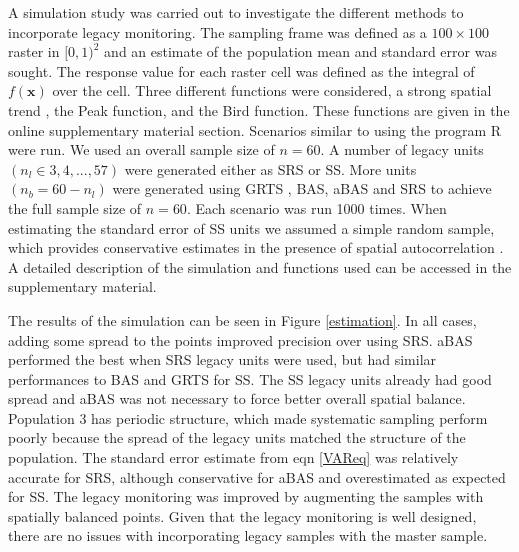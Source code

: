 \documentclass[titlepage]{article}
\begin{document}
A simulation study was carried out to investigate the different methods to incorporate legacy monitoring. The sampling frame was defined as a $100\times100$ raster in $[0,1)^2$ and an estimate of the population mean and standard error was sought. The response value for each raster cell was defined as the integral of $f(\boldsymbol{x})$ over the cell. Three different functions were considered, a strong spatial trend \citep{Robertson2013, Grafstrom2012}, the Peak function, and the Bird function. These functions are given in the online supplementary material section. Scenarios similar to \citet{Foster2017} using the program R \citep{R} were run. We used an overall sample size of $n = 60$. A number of legacy units $(n_l \in 3,4,...,57)$ were generated either as SRS or SS. More units $(n_b = 60 - n_l)$ were generated using GRTS \citep{spsurvey}, BAS, aBAS \citep{MBHdesign} and SRS to achieve the full sample size of $n = 60$. Each scenario was run 1000 times. When estimating the standard error of SS units we assumed a simple random sample, which provides conservative estimates in the presence of spatial autocorrelation \citep{Lundberg2014,Strand2017}. A detailed description of the simulation and functions used can be accessed in the supplementary material.

The results of the simulation can be seen in Figure \ref{estimation}. In all cases, adding some spread to the points improved precision over using SRS. aBAS performed the best when SRS legacy units were used, but had similar performances to BAS and GRTS for SS. The SS legacy units already had good spread and aBAS was not necessary to force better overall spatial balance. Population 3 has periodic structure, which made systematic sampling perform poorly because the spread of the legacy units matched the structure of the population. The standard error estimate from eqn \ref{VAReq} was relatively accurate for SRS, although conservative for aBAS and overestimated as expected for SS. The legacy monitoring was improved by augmenting the samples with spatially balanced points. Given that the legacy monitoring is well designed, there are no issues with incorporating legacy samples with the master sample.
\end{document}
